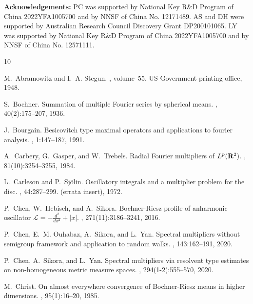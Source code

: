 \documentclass[12pt]{amsart}
\begin{document}
\bigskip

\noindent
{\bf Acknowledgements:}  PC was supported  by National Key R$\&$D Program of China 2022YFA1005700 and
by  NNSF of China No. 12171489.
AS and DH were 
 supported by Australian Research Council  Discovery Grant  DP200101065. 
LY was  supported  by National Key R$\&$D Program of China 2022YFA1005700  and
by  NNSF of China No. 12571111.

%
%

\begin{thebibliography}{10}
	
	
	M.~Abramowitz and I.~A. Stegun.
	, volume~55.
	\newblock US Government printing office, 1948.
	
	S.~Bochner.
	\newblock Summation of multiple {F}ourier series by spherical means.
	, 40(2):175--207, 1936.
	
	J.~Bourgain.
	\newblock Besicovitch type maximal operators and applications to fourier
	analysis.
	, 1:147--187, 1991.
	
	A.~Carbery, G.~Gasper, and W.~Trebels.
	\newblock Radial {F}ourier multipliers of {$L\sp{p}({\bf R}\sp{2})$}.
	, 81(10):3254--3255, 1984.
	
	L.~Carleson and P.~Sj\"olin.
	\newblock Oscillatory integrals and a multiplier problem for the disc.
	, 44:287--299. (errata insert), 1972.
	
	P.~Chen, W.~Hebisch, and A.~Sikora.
	\newblock Bochner-{Riesz} profile of anharmonic oscillator {{\(\mathcal{L} =
			-\frac{d^2}{dx^2} + |x|\)}}.
	, 271(11):3186--3241, 2016.
	
	P.~Chen, E.~M. Ouhabaz, A.~Sikora, and L.~Yan.
	\newblock Spectral multipliers without semigroup framework and application to
	random walks.
	, 143:162--191, 2020.
	
	P.~Chen, A.~Sikora, and L.~Yan.
	\newblock Spectral multipliers via resolvent type estimates on non-homogeneous
	metric measure spaces.
	, 294(1-2):555--570, 2020.
	
	M.~Christ.
	\newblock On almost everywhere convergence of {B}ochner-{R}iesz means in higher
	dimensions.
	, 95(1):16--20, 1985.
	

\end{thebibliography}
\end{document}
